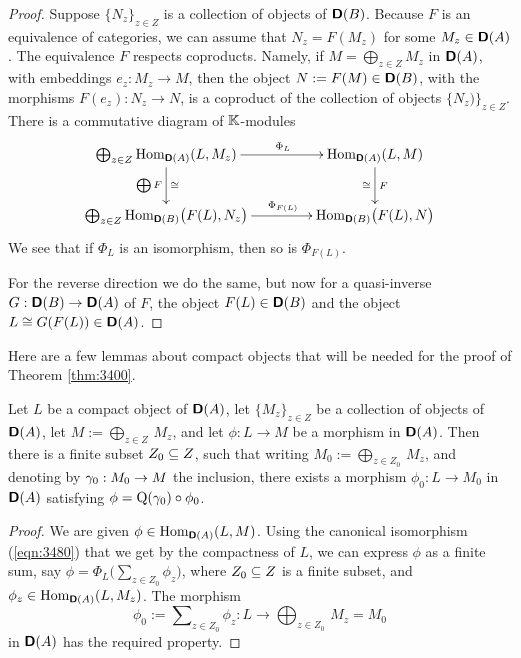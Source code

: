 \begin{proof}
Suppose $\{ N_z \}_{z \in Z}$ is a collection of objects of $\boldsymbol{\mathsf{D}}(B)$. 
Because $F$ is an equivalence of categories, we can assume that 
$N_z = F(M_z)$ for some $M_z \in \boldsymbol{\mathsf{D}}(A)$.
The equivalence $F$ respects coproducts. Namely, if 
$M = \bigoplus_{z \in Z} M_z$ in $\boldsymbol{\mathsf{D}}(A)$, 
with embeddings $e_z : M_z \to M$, 
then the object $N := F(M) \in \boldsymbol{\mathsf{D}}(B)$, with the morphisms 
$F(e_z) : N_z \to N$,
is a coproduct of the collection of objects
$\{ N_z) \}_{z \in Z}$. 
There is a commutative diagram of $\mathbb{K}$-modules
\[  \UseTips  \xymatrix @C=10ex @R=6ex {
\bigoplus_{z \in Z} \opn{Hom}_{\dcat{D}(A)}(L, M_z) 
\ar[r]^(0.56){\Phi_L}
\ar[d]_{\bigoplus F}^{\cong}
&
\opn{Hom}_{\dcat{D}(A)}(L, M) 
\ar[d]^{F}_{\cong}
\\
\bigoplus_{z \in Z} \opn{Hom}_{\dcat{D}(B)} \bigl( F(L), N_z \bigr) 
\ar[r]^(0.56){\Phi_{F(L)}}
&
\opn{Hom}_{\dcat{D}(B)} \bigl( F(L), N \bigr) 
} \]
We see that if $\Phi_L$ is an isomorphism, then so is $\Phi_{F(L)}$.

For the reverse direction we do the same, but now for a quasi-inverse 
$G : \boldsymbol{\mathsf{D}}(B) \to \boldsymbol{\mathsf{D}}(A)$ of $F$, the object 
$F(L) \in \boldsymbol{\mathsf{D}}(B)$ and the object $L \cong G(F(L)) \in \boldsymbol{\mathsf{D}}(A)$.
\end{proof}

Here are a few lemmas about compact objects that will be needed for the proof 
of Theorem \ref{thm:3400}. 

\begin{lem} \label{lem:3405}
Let $L$ be a compact object of $\boldsymbol{\mathsf{D}}(A)$, let 
$\{ M_z \}_{z \in Z}$ be a collection of objects of $\boldsymbol{\mathsf{D}}(A)$, 
let $M := \bigoplus_{z \in Z} \, M_z$, 
and let $\phi : L \to M$
be a morphism in $\boldsymbol{\mathsf{D}}(A)$. Then there is a finite subset 
$Z_0 \subseteq Z$, such that writing 
$M_0 := \bigoplus_{z \in Z_0} \, M_z$, 
and denoting by $\gamma_0 : M_0 \to M$ the inclusion, 
there exists a morphism 
$\phi_0 : L \to M_0$ in $\boldsymbol{\mathsf{D}}(A)$ satisfying 
$\phi = \operatorname{Q}(\gamma_0) \circ \phi_0$. 
\end{lem}

\begin{proof}
We are given 
$\phi \in \operatorname{Hom}_{\boldsymbol{\mathsf{D}}(A)}(L, M)$.
Using the canonical isomorphism (\ref{eqn:3480})
that we get by the compactness of $L$, 
we can express $\phi$ as a finite sum, say  
$\phi = \Phi_L \bigl( \sum\nolimits_{z \in Z_0} \phi_z \bigr)$,
where $Z_0 \subseteq Z$ is a finite subset, and 
$\phi_z \in \operatorname{Hom}_{\boldsymbol{\mathsf{D}}(A)}(L, M_z)$.
The morphism 
\[ \phi_0 := \sum\nolimits_{z \in Z_0} \phi_z : L \to 
\bigoplus\nolimits_{z \in Z_0} \, M_z = M_0 \]
in $\boldsymbol{\mathsf{D}}(A)$ has the required property.
\end{proof}

